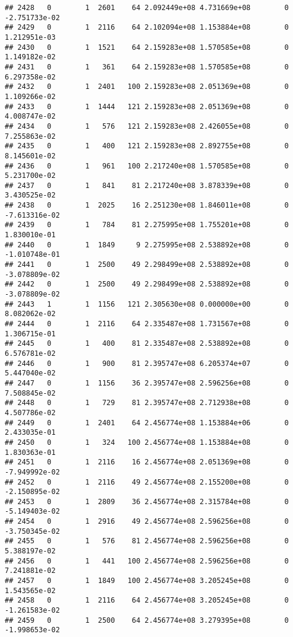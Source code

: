 \documentclass[
]{article}
\begin{document}
\begin{enumerate}
\begin{verbatim}
## 2428   0        1  2601    64 2.092449e+08 4.731669e+08        0 -2.751733e-02
## 2429   0        1  2116    64 2.102094e+08 1.153884e+08        0  1.212951e-03
## 2430   0        1  1521    64 2.159283e+08 1.570585e+08        0  1.149182e-02
## 2431   0        1   361    64 2.159283e+08 1.570585e+08        0  6.297358e-02
## 2432   0        1  2401   100 2.159283e+08 2.051369e+08        0  1.109266e-02
## 2433   0        1  1444   121 2.159283e+08 2.051369e+08        0  4.008747e-02
## 2434   0        1   576   121 2.159283e+08 2.426055e+08        0  7.255863e-02
## 2435   0        1   400   121 2.159283e+08 2.892755e+08        0  8.145601e-02
## 2436   0        1   961   100 2.217240e+08 1.570585e+08        0  5.231700e-02
## 2437   0        1   841    81 2.217240e+08 3.878339e+08        0  3.430525e-02
## 2438   0        1  2025    16 2.251230e+08 1.846011e+08        0 -7.613316e-02
## 2439   0        1   784    81 2.275995e+08 1.755201e+08        0  1.830010e-01
## 2440   0        1  1849     9 2.275995e+08 2.538892e+08        0 -1.010748e-01
## 2441   0        1  2500    49 2.298499e+08 2.538892e+08        0 -3.078809e-02
## 2442   0        1  2500    49 2.298499e+08 2.538892e+08        0 -3.078809e-02
## 2443   1        1  1156   121 2.305630e+08 0.000000e+00        0  8.082062e-02
## 2444   0        1  2116    64 2.335487e+08 1.731567e+08        0  1.306715e-01
## 2445   0        1   400    81 2.335487e+08 2.538892e+08        0  6.576781e-02
## 2446   0        1   900    81 2.395747e+08 6.205374e+07        0  5.447040e-02
## 2447   0        1  1156    36 2.395747e+08 2.596256e+08        0  7.508845e-02
## 2448   0        1   729    81 2.395747e+08 2.712938e+08        0  4.507786e-02
## 2449   0        1  2401    64 2.456774e+08 1.153884e+06        0  2.433035e-01
## 2450   0        1   324   100 2.456774e+08 1.153884e+08        0  1.830363e-01
## 2451   0        1  2116    16 2.456774e+08 2.051369e+08        0 -7.949992e-02
## 2452   0        1  2116    49 2.456774e+08 2.155200e+08        0 -2.150895e-02
## 2453   0        1  2809    36 2.456774e+08 2.315784e+08        0 -5.149403e-02
## 2454   0        1  2916    49 2.456774e+08 2.596256e+08        0 -3.750345e-02
## 2455   0        1   576    81 2.456774e+08 2.596256e+08        0  5.388197e-02
## 2456   0        1   441   100 2.456774e+08 2.596256e+08        0  7.241881e-02
## 2457   0        1  1849   100 2.456774e+08 3.205245e+08        0  1.543565e-02
## 2458   0        1  2116    64 2.456774e+08 3.205245e+08        0 -1.261583e-02
## 2459   0        1  2500    64 2.456774e+08 3.279395e+08        0 -1.998653e-02

\end{verbatim}
\end{enumerate}
\end{document}
